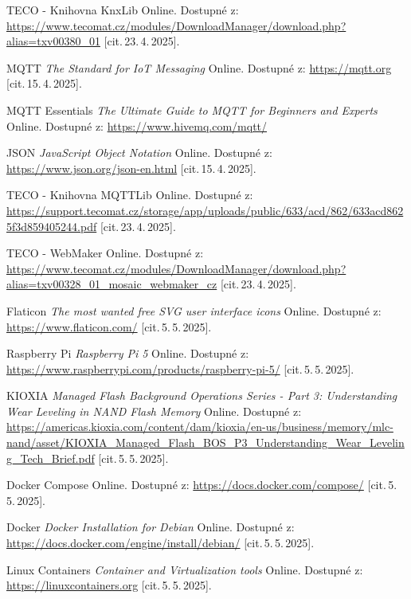 \begin{thebibliography}{99}
		TECO - Knihovna KnxLib\/ Online. 
		Dostupné z:
	\url{https://www.tecomat.cz/modules/DownloadManager/download.php?alias=txv00380_01}
		[cit.\,23.\,4.\,2025].

		MQTT \emph{The Standard for IoT Messaging}\/ Online. 
		Dostupné z:
	\url{https://mqtt.org}
		[cit.\,15.\,4.\,2025].

		MQTT Essentials \emph{The Ultimate Guide to MQTT for Beginners and Experts}\/ Online.
		Dostupné z:
		\url{https://www.hivemq.com/mqtt/}

		JSON \emph{JavaScript Object Notation}\/ Online. 
		Dostupné z:
	\url{https://www.json.org/json-en.html}
		[cit.\,15.\,4.\,2025].

		TECO - Knihovna MQTTLib\/ Online. 
		Dostupné z:
	\url{https://support.tecomat.cz/storage/app/uploads/public/633/acd/862/633acd8625f3d859405244.pdf}
		[cit.\,23.\,4.\,2025].

		TECO - WebMaker\/ Online. 
		Dostupné z:
	\url{https://www.tecomat.cz/modules/DownloadManager/download.php?alias=txv00328_01_mosaic_webmaker_cz}
		[cit.\,23.\,4.\,2025].

		Flaticon \emph{The most wanted free SVG user interface icons}\/ Online. 
		Dostupné z:
	\url{https://www.flaticon.com/}
		[cit.\,5.\,5.\,2025].

		Raspberry Pi \emph{Raspberry Pi 5}\/ Online. 
		Dostupné z:
	\url{https://www.raspberrypi.com/products/raspberry-pi-5/}
		[cit.\,5.\,5.\,2025].

		KIOXIA \emph{Managed Flash Background Operations Series - Part 3: Understanding Wear Leveling in NAND Flash Memory}\/ Online. 
		Dostupné z:
	\url{https://americas.kioxia.com/content/dam/kioxia/en-us/business/memory/mlc-nand/asset/KIOXIA_Managed_Flash_BOS_P3_Understanding_Wear_Leveling_Tech_Brief.pdf}
		[cit.\,5.\,5.\,2025].

		Docker Compose\/ Online. 
		Dostupné z:
	\url{https://docs.docker.com/compose/}
		[cit.\,5.\,5.\,2025].

		Docker \emph{Docker Installation for Debian}\/ Online. 
		Dostupné z:
	\url{https://docs.docker.com/engine/install/debian/}
		[cit.\,5.\,5.\,2025].

		Linux Containers \emph{Container and Virtualization tools}\/ Online.
		Dostupné z:
	\url{https://linuxcontainers.org}
		[cit.\,5.\,5.\,2025].


\end{thebibliography}
